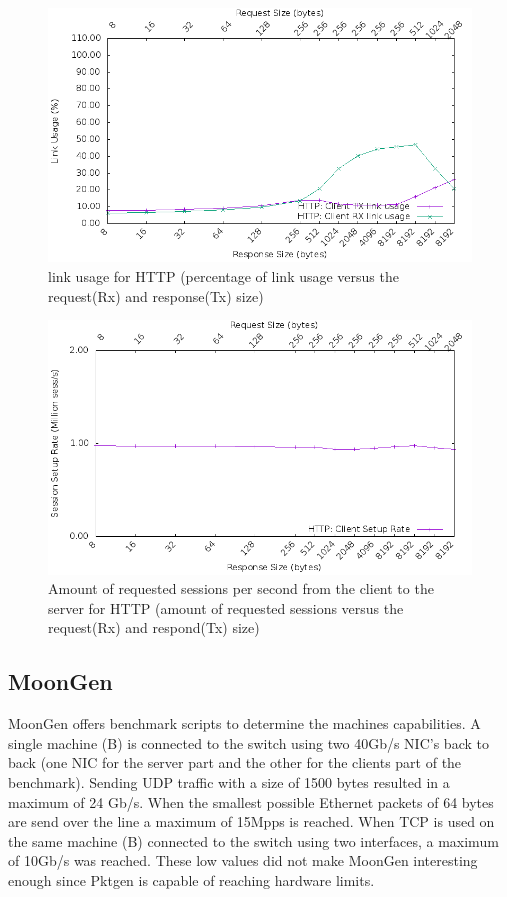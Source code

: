\begin{figure}[H]
  \includegraphics[scale=0.6]{images/http_link_usage.png}
  \caption{link usage for HTTP  (percentage of link usage versus the request(Rx) and response(Tx) size)}
  \label{fig:httplink}
\end{figure}

\begin{figure}[H]
  \includegraphics[scale=0.6]{images/http_setup.png}
  \caption{Amount of requested sessions per second from the client to the server for HTTP (amount of requested sessions versus the request(Rx) and respond(Tx) size)}
  \label{fig:httpsession}
\end{figure}


\subsection{MoonGen}
MoonGen offers benchmark scripts to determine the machines capabilities. A single machine (B) is connected to the switch using two 40Gb/s NIC's back to back (one NIC for the server part and the other for the clients part of the benchmark). Sending UDP traffic with a size of 1500 bytes resulted in a maximum of 24 Gb/s. When the smallest possible Ethernet packets of 64 bytes are send over the line a maximum of 15Mpps is reached. When TCP is used on the same machine (B) connected to the switch using two interfaces, a maximum of 10Gb/s was reached. These low values did not make MoonGen interesting enough since Pktgen is capable of reaching hardware limits. 


